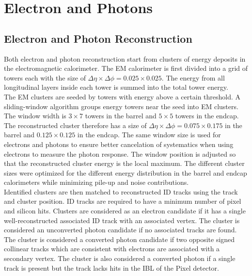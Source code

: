 \section{Electron and Photons}
\label{sec:reco:EM}

\subsection{Electron and Photon Reconstruction}
\label{sec:EM:reco}

\indent Both electron and photon reconstruction start from clusters of energy deposits in the electromagnetic calorimeter.  The EM calorimeter is first divided into a grid of towers each with the size of $\Delta \eta \times \Delta \phi = 0.025 \times 0.025$.  The energy from all longitudinal layers inside each tower is summed into the total tower energy.  \\

\indent The EM clusters are seeded by towers with energy above a certain threshold.  A sliding-window algorithm groups energy towers near the seed into EM clusters.\cite{EMReco13TeV,EMReco8TeV}  The window width is $3 \times 7$ towers in the barrel and $5 \times 5$ towers in the endcap.  The reconstructed cluster therefore has a size of $\Delta \eta \times \Delta \phi = 0.075 \times 0.175$ in the barrel and $ 0.125 \times 0.125$ in the endcap.  The same window size is used for electrons and photons to ensure better cancelation of systematics when using electrons to measure the photon response.\cite{EMReco13TeV}  The window position is adjusted so that the reconstructed cluster energy is the local maximum.  The different cluster sizes were optimized for the different energy distribution in the barrel and endcap calorimeters while minimizing pile-up and noise contributions.\cite{EMReco13TeV}  \\

\indent Identified clusters are then matched to reconstructed ID tracks using the track and cluster position.  ID tracks are required to have a minimum number of pixel and silicon hits.  Clusters are considered as an electron candidate if it has a single well-reconstructed associated ID track with an associated vertex.  The cluster is considered an unconverted photon candidate if no associated tracks are found.  The cluster is considered a converted photon candidate if two opposite signed collinear tracks which are consistent with electrons are associated with a secondary vertex.  The cluster is also considered a converted photon if a single track is present but the track lacks hits in the IBL of the Pixel detector.  \\

